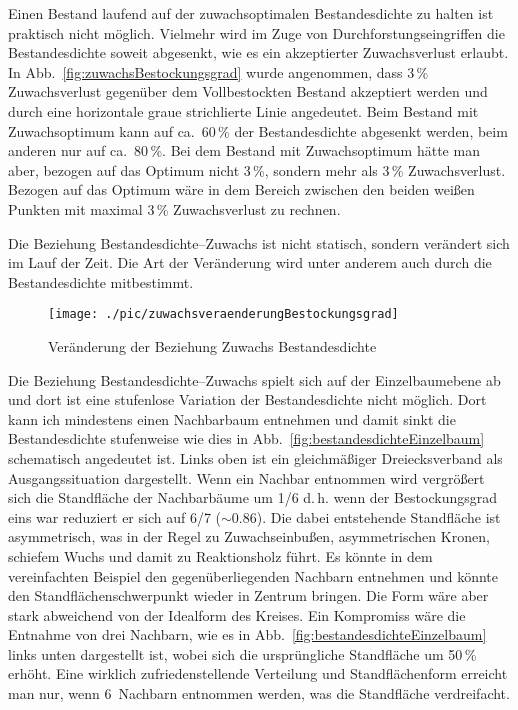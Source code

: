 \documentclass[twocolumn]{scrartcl}
\begin{document}
Einen Bestand laufend auf der zuwachsoptimalen Bestandesdichte zu halten ist
praktisch nicht möglich. Vielmehr wird im Zuge von Durchforstungseingriffen die
Bestandesdichte soweit abgesenkt, wie es ein akzeptierter Zuwachsverlust
erlaubt. In Abb.~\ref{fig:zuwachsBestockungsgrad} wurde angenommen, dass 3\,\%
Zuwachsverlust gegenüber dem Vollbestockten Bestand akzeptiert werden und durch
eine horizontale graue strichlierte Linie angedeutet. Beim Bestand mit
Zuwachsoptimum kann auf ca.\ 60\,\% der Bestandesdichte abgesenkt werden, beim
anderen nur auf ca.\ 80\,\%. Bei dem Bestand mit Zuwachsoptimum hätte man aber,
bezogen auf das Optimum nicht 3\,\%, sondern mehr als 3\,\% Zuwachsverlust.
Bezogen auf das Optimum wäre in dem Bereich zwischen den beiden weißen Punkten
mit maximal 3\,\% Zuwachsverlust zu rechnen.

Die Beziehung Bestandesdichte--Zuwachs ist nicht statisch, sondern verändert sich im Lauf der Zeit. Die Art der Veränderung wird unter anderem auch durch die Bestandesdichte mitbestimmt.

\begin{figure}[htbp]
  \centering
  \texttt{[image: ./pic/zuwachsveraenderungBestockungsgrad]}
  \caption{Veränderung der Beziehung Zuwachs Bestandesdichte}
  \label{fig:zuwachsveraenderungBestockungsgrad}
\end{figure}

Die Beziehung Bestandesdichte--Zuwachs spielt sich auf der Einzelbaumebene ab
und dort ist eine stufenlose Variation der Bestandesdichte nicht möglich. Dort
kann ich mindestens einen Nachbarbaum entnehmen und damit sinkt die
Bestandesdichte stufenweise wie dies in Abb.~\ref{fig:bestandesdichteEinzelbaum}
schematisch angedeutet ist. Links oben ist ein gleichmäßiger Dreiecksverband als
Ausgangssituation dargestellt. Wenn ein Nachbar entnommen wird vergrößert sich
die Standfläche der Nachbarbäume um 1/6 d.\,h. wenn der Bestockungsgrad eins war
reduziert er sich auf 6/7 ($\sim 0.86$). Die dabei entstehende Standfläche ist
asymmetrisch, was in der Regel zu Zuwachseinbußen, asymmetrischen Kronen,
schiefem Wuchs und damit zu Reaktionsholz führt. Es könnte in dem vereinfachten
Beispiel den gegenüberliegenden Nachbarn entnehmen und könnte den
Standflächenschwerpunkt wieder in Zentrum bringen. Die Form wäre aber stark
abweichend von der Idealform des Kreises. Ein Kompromiss wäre die Entnahme von
drei Nachbarn, wie es in Abb.~\ref{fig:bestandesdichteEinzelbaum} links unten
dargestellt ist, wobei sich die ursprüngliche Standfläche um 50\,\% erhöht. Eine
wirklich zufriedenstellende Verteilung und Standflächenform erreicht man nur,
wenn 6~Nachbarn entnommen werden, was die Standfläche verdreifacht.
\end{document}
